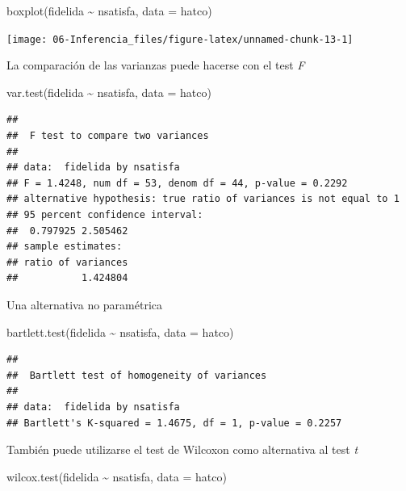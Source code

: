 \documentclass[
]{book}
\newenvironment{Shaded}{\begin{snugshade}}{\end{snugshade}}
\newcommand{\AttributeTok}[1]{\textcolor[rgb]{0.77,0.63,0.00}{#1}}
\newcommand{\FunctionTok}[1]{\textcolor[rgb]{0.00,0.00,0.00}{#1}}
\newcommand{\NormalTok}[1]{#1}
\newcommand{\SpecialCharTok}[1]{\textcolor[rgb]{0.00,0.00,0.00}{#1}}
\theoremstyle{break}
\begin{document}
\begin{Shaded}
\begin{Highlighting}[]
\FunctionTok{boxplot}\NormalTok{(fidelida }\SpecialCharTok{\textasciitilde{}}\NormalTok{ nsatisfa, }\AttributeTok{data =}\NormalTok{ hatco)}
\end{Highlighting}
\end{Shaded}

\begin{center}\texttt{[image: 06-Inferencia\_files/figure-latex/unnamed-chunk-13-1]} \end{center}

La comparación de las varianzas puede hacerse con el test \emph{F}

\begin{Shaded}
\begin{Highlighting}[]
\FunctionTok{var.test}\NormalTok{(fidelida }\SpecialCharTok{\textasciitilde{}}\NormalTok{ nsatisfa, }\AttributeTok{data =}\NormalTok{ hatco)}
\end{Highlighting}
\end{Shaded}

\begin{verbatim}
## 
##  F test to compare two variances
## 
## data:  fidelida by nsatisfa
## F = 1.4248, num df = 53, denom df = 44, p-value = 0.2292
## alternative hypothesis: true ratio of variances is not equal to 1
## 95 percent confidence interval:
##  0.797925 2.505462
## sample estimates:
## ratio of variances 
##           1.424804
\end{verbatim}

Una alternativa no paramétrica

\begin{Shaded}
\begin{Highlighting}[]
\FunctionTok{bartlett.test}\NormalTok{(fidelida }\SpecialCharTok{\textasciitilde{}}\NormalTok{ nsatisfa, }\AttributeTok{data =}\NormalTok{ hatco)}
\end{Highlighting}
\end{Shaded}

\begin{verbatim}
## 
##  Bartlett test of homogeneity of variances
## 
## data:  fidelida by nsatisfa
## Bartlett's K-squared = 1.4675, df = 1, p-value = 0.2257
\end{verbatim}

También puede utilizarse el test de Wilcoxon como alternativa al test \emph{t}

\begin{Shaded}
\begin{Highlighting}[]
\FunctionTok{wilcox.test}\NormalTok{(fidelida }\SpecialCharTok{\textasciitilde{}}\NormalTok{ nsatisfa, }\AttributeTok{data =}\NormalTok{ hatco)}
\end{Highlighting}
\end{Shaded}
\end{document}
